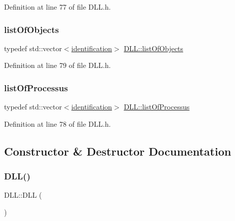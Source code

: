 Definition at line 77 of file D\+L\+L.\+h.

\mbox{\label{classDLL_a68629aa6f9103c5a3082511ff8218b1e}} 
\subsubsection{\texorpdfstring{list\+Of\+Objects}{listOfObjects}}
{\footnotesize\ttfamily typedef std\+::vector$<$\hyperlink{classDLL_aa2df9e9226052bfa93a6df56f1ca689b}{identification}$>$ \hyperlink{classDLL_a68629aa6f9103c5a3082511ff8218b1e}{D\+L\+L\+::list\+Of\+Objects}}



Definition at line 79 of file D\+L\+L.\+h.

\mbox{\label{classDLL_aded1b0bb41b288ed4f34cb6d6632d486}} 
\subsubsection{\texorpdfstring{list\+Of\+Processus}{listOfProcessus}}
{\footnotesize\ttfamily typedef std\+::vector$<$\hyperlink{classDLL_aa2df9e9226052bfa93a6df56f1ca689b}{identification}$>$ \hyperlink{classDLL_aded1b0bb41b288ed4f34cb6d6632d486}{D\+L\+L\+::list\+Of\+Processus}}



Definition at line 78 of file D\+L\+L.\+h.



\subsection{Constructor \& Destructor Documentation}
\mbox{\label{classDLL_a78a22a98025697c4862ffc2a7cfcb648}} 
\subsubsection{\texorpdfstring{D\+L\+L()}{DLL()}}
{\footnotesize\ttfamily D\+L\+L\+::\+D\+LL (\begin{DoxyParamCaption}{ }\end{DoxyParamCaption})}



